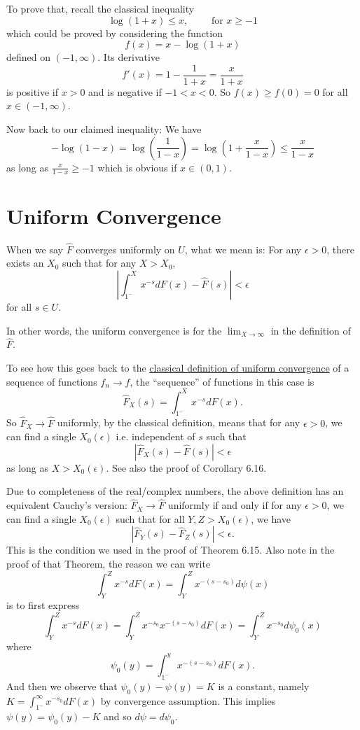 \documentclass[12pt]{article}
\newcommand{\Fhat}{\widehat{F}}
\newcommand{\Abs}[1]{\left| #1 \right|}
\begin{document}
To prove that, recall the classical inequality
$$\log(1 + x) \leq x, \qquad \text{ for } x \geq -1$$
which could be proved by considering the function
$$f(x) = x - \log(1 + x)$$
defined on $(-1, \infty)$. Its derivative
$$f'(x) = 1 - \frac{1}{1 + x} = \frac{x}{1 + x}$$
is positive if $x > 0$ and is negative if $-1 < x < 0$. So $f(x) \geq f(0) = 0$ for all $x \in (-1, \infty)$.

Now back to our claimed inequality: We have
$$-\log(1 - x) = \log\left(\frac{1}{1 - x}\right) = \log\left(1 + \frac{x}{1 -  x}\right) \leq \frac{x}{1 - x}$$
as long as $\frac{x}{1 - x} \geq -1$ which is obvious if $x \in (0, 1)$.

\section{Uniform Convergence}

When we say $\Fhat$ converges uniformly on $U$, what we mean is: For any $\epsilon > 0$, there exists an $X_0$ such that for any $X > X_0$,
$$\Abs{\int_{1^-}^X x^{-s} dF(x) - \Fhat(s)} < \epsilon$$
for all $s \in U$.

In other words, the uniform convergence is for the $\lim_{X \rightarrow \infty}$ in the definition of $\Fhat$.

To see how this goes back to the \href{https://en.wikipedia.org/wiki/Uniform\_convergence}{classical definition of uniform convergence} of a sequence of functions $f_n \rightarrow f$, the ``sequence'' of functions in this case is
$$\Fhat_X(s) = \int_{1^-}^X x^{-s} dF(x).$$
So $\Fhat_X \rightarrow \Fhat$ uniformly, by the classical definition, means that for any $\epsilon > 0$, we can find a single $X_0(\epsilon)$ i.e. independent of $s$ such that
$$\Abs{ \Fhat_X(s) - \Fhat(s) } < \epsilon$$
as long as $X > X_0(\epsilon)$. See also the proof of Corollary 6.16.

Due to completeness of the real/complex numbers, the above definition has an equivalent Cauchy's version: $\Fhat_X \rightarrow \Fhat$ uniformly if and only if for any $\epsilon > 0$, we can find a single $X_0(\epsilon)$ such that for all $Y, Z > X_0(\epsilon)$, we have
$$\Abs{ \Fhat_Y(s) - \Fhat_Z(s) } < \epsilon.$$
This is the condition we used in the proof of Theorem 6.15. Also note in the proof of that Theorem, the reason we can write
$$\int_Y^Z x^{-s} dF(x) = \int_Y^Z x^{-(s-s_0)} d\psi(x)$$
is to first express
$$\int_Y^Z x^{-s} dF(x) = \int_Y^Z x^{-s_0} x^{-(s-s_0)} dF(x) = \int_Y^Z x^{-s_0} d\psi_0(x)$$
where 
$$\psi_0(y) = \int_{1^-}^y x^{-(s-s_0)} dF(x).$$
And then we observe that $\psi_0(y) - \psi(y) = K$ is a constant, namely $K = \int_{1^-}^{\infty} x^{-s_0} dF(x)$ by convergence assumption. This implies $\psi(y) = \psi_0(y) - K$ and so $d\psi = d\psi_0$.
\end{document}
